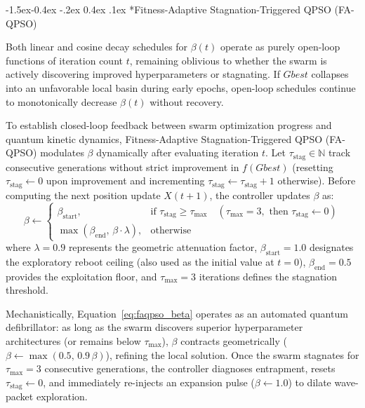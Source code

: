 \documentclass[10pt]{article}
\makeatletter
\renewcommand\subsubsection{\@startsection{subsubsection}{3}{\z@}%
                                     {-1.5ex\@plus -0.4ex \@minus -.2ex}%
                                     {0.4ex \@plus .1ex}%
                                     {\normalfont\itshape\fontsize{7.8pt}{10.0pt}\selectfont}}
\makeatother
\begin{document}
\subsubsection*{Fitness-Adaptive Stagnation-Triggered QPSO (FA-QPSO)}

Both linear and cosine decay schedules for $\beta(t)$ operate as purely open-loop functions of iteration count $t$, remaining oblivious to whether the swarm is actively discovering improved hyperparameters or stagnating. If $Gbest$ collapses into an unfavorable local basin during early epochs, open-loop schedules continue to monotonically decrease $\beta(t)$ without recovery.

To establish closed-loop feedback between swarm optimization progress and quantum kinetic dynamics, Fitness-Adaptive Stagnation-Triggered QPSO (FA-QPSO) modulates $\beta$ dynamically after evaluating iteration $t$. Let $\tau_{\mathrm{stag}} \in \mathbb{N}$ track consecutive generations without strict improvement in $f(Gbest)$ (resetting $\tau_{\mathrm{stag}} \leftarrow 0$ upon improvement and incrementing $\tau_{\mathrm{stag}} \leftarrow \tau_{\mathrm{stag}} + 1$ otherwise). Before computing the next position update $X(t+1)$, the controller updates $\beta$ as:
\begin{equation}
\beta \leftarrow \begin{cases}
\beta_{\mathrm{start}}, & \text{if } \tau_{\mathrm{stag}} \ge \tau_{\max} \quad (\tau_{\max} = 3, \text{ then } \tau_{\mathrm{stag}} \leftarrow 0) \\
\max(\beta_{\mathrm{end}}, \, \beta \cdot \lambda), & \text{otherwise}
\end{cases} \label{eq:faqpso_beta}
\end{equation}
where $\lambda = 0.9$ represents the geometric attenuation factor, $\beta_{\mathrm{start}} = 1.0$ designates the exploratory reboot ceiling (also used as the initial value at $t=0$), $\beta_{\mathrm{end}} = 0.5$ provides the exploitation floor, and $\tau_{\max} = 3$ iterations defines the stagnation threshold.

Mechanistically, Equation~\eqref{eq:faqpso_beta} operates as an automated quantum defibrillator: as long as the swarm discovers superior hyperparameter architectures (or remains below $\tau_{\max}$), $\beta$ contracts geometrically ($\beta \leftarrow \max(0.5, \, 0.9\,\beta)$), refining the local solution. Once the swarm stagnates for $\tau_{\max} = 3$ consecutive generations, the controller diagnoses entrapment, resets $\tau_{\mathrm{stag}} \leftarrow 0$, and immediately re-injects an expansion pulse ($\beta \leftarrow 1.0$) to dilate wave-packet exploration.
\end{document}
